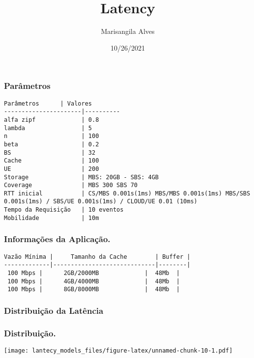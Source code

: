 \documentclass[
]{article}
\title{Latency}
\author{Marisangila Alves}
\date{10/26/2021}
\begin{document}
\maketitle

\hypertarget{paruxe2metros}{%
\subsubsection{Parâmetros}\label{paruxe2metros}}

\begin{verbatim}
Parâmetros      | Valores
----------------------|----------
alfa zipf             | 0.8 
lambda                | 5
n                     | 100
beta                  | 0.2
BS                    | 32
Cache                 | 100
UE                    | 200
Storage               | MBS: 20GB - SBS: 4GB
Coverage              | MBS 300 SBS 70
RTT inicial           | CS/MBS 0.001s(1ms) MBS/MBS 0.001s(1ms) MBS/SBS 0.001s(1ms) / SBS/UE 0.001s(1ms) / CLOUD/UE 0.01 (10ms)
Tempo da Requisição   | 10 eventos
Mobilidade            | 10m
\end{verbatim}

\hypertarget{informauxe7uxf5es-da-aplicauxe7uxe3o.}{%
\subsubsection{Informações da
Aplicação.}\label{informauxe7uxf5es-da-aplicauxe7uxe3o.}}

\begin{verbatim}
Vazão Mínima |     Tamanho da Cache        | Buffer |
-------------|-----------------------------|--------|
 100 Mbps |      2GB/2000MB             |  48Mb  |
 100 Mbps |      4GB/4000MB             |  48Mb  |
 100 Mbps |      8GB/8000MB             |  48Mb  |
\end{verbatim}

\hypertarget{distribuiuxe7uxe3o-da-latuxeancia}{%
\subsubsection{Distribuição da
Latência}\label{distribuiuxe7uxe3o-da-latuxeancia}}

\hypertarget{distribuiuxe7uxe3o.}{%
\subsubsection{Distribuição.}\label{distribuiuxe7uxe3o.}}

\texttt{[image: lantecy\_models\_files/figure-latex/unnamed-chunk-10-1.pdf]}
\end{document}
